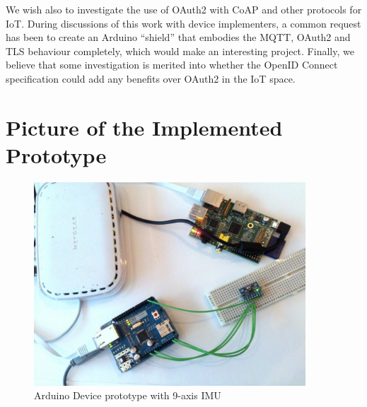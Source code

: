 \documentclass{IEEEtran}
\begin{document}
We wish also to investigate the use of OAuth2 with CoAP and other protocols for IoT. During discussions of this work with device implementers, a common request has been to create an Arduino ``shield'' that embodies the MQTT, OAuth2 and TLS behaviour completely, which would make an interesting project.
Finally, we believe that some investigation is merited into whether the OpenID Connect specification could add any benefits over OAuth2 in the IoT space.





%


\appendix
\FloatBarrier
\section{Picture of the Implemented Prototype}\label{app:ard}
\begin{figure}[!t]
\centering
\includegraphics[width=4in]{arduino-device.png}
\caption{Arduino Device prototype with 9-axis IMU}
\label{fig:arduino-device}
\end{figure}
\FloatBarrier
\end{document}
